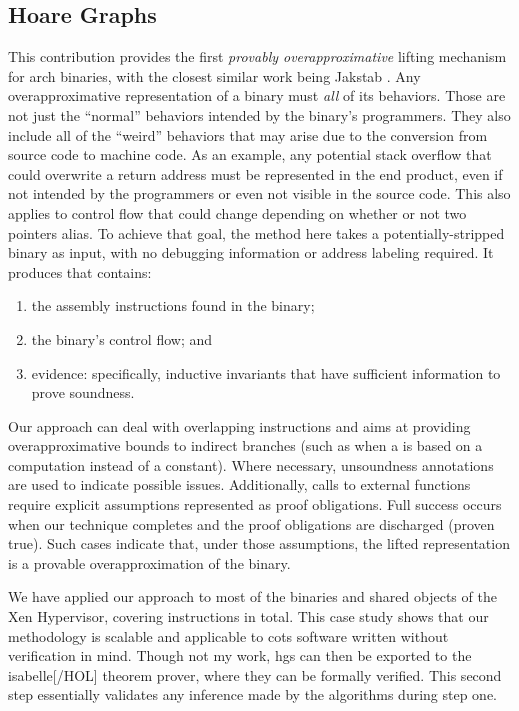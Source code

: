 \subsection{Hoare Graphs}
This contribution provides the first \emph{provably overapproximative} lifting mechanism for \gls{arch} binaries, with the closest similar work being Jakstab \autocite{kinder2010static,kinder2012alternating,kinder2012virtualization}.
Any overapproximative representation of a binary must \emph{all} of its behaviors.
Those are not just the ``normal'' behaviors intended by the binary's programmers.
They also include all of the ``weird'' behaviors that may arise due to the conversion from source code to machine code.
As an example, any potential stack overflow that could overwrite a return address must be represented in the end product, even if not intended by the programmers or even not visible in the source code.
This also applies to control flow that could change depending on whether or not two pointers alias.
To achieve that goal, the method here takes a potentially-stripped binary as input, with no debugging information or address labeling required.
It produces  that contains:
\begin{enumerate}
  \item the assembly instructions found in the binary;
  \item the binary's control flow; and
  \item evidence: specifically, inductive invariants that have sufficient information to prove soundness.
\end{enumerate}
Our approach can deal with overlapping instructions and aims at providing overapproximative bounds to indirect branches (such as when a  is based on a computation instead of a constant).
Where necessary, unsoundness annotations are used to indicate possible issues.
Additionally, calls to external functions require explicit assumptions represented as proof obligations.
Full success occurs when our technique completes and the proof obligations are discharged (proven true).
Such cases indicate that, under those assumptions, the lifted representation is a provable overapproximation of the binary.

We have applied our approach to most of the binaries and shared objects of the Xen Hypervisor, covering  instructions in total.
This case study shows that our methodology is scalable and applicable to \ac{cots} software written without verification in mind.
Though not my work, \acp{hg} can then be exported to the \gls{isabelle}[/HOL] theorem prover, where they can be formally verified.
This second step essentially validates any inference made by the algorithms during step one.

